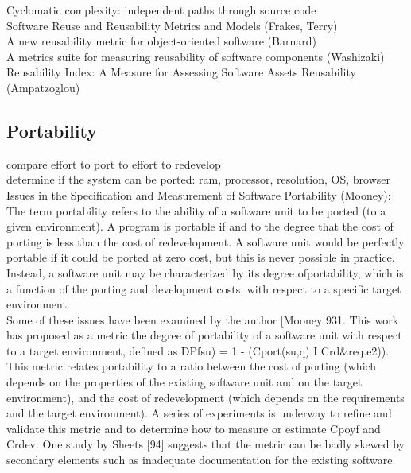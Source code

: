 \documentclass{article}
\begin{document}
Cyclomatic complexity: independent paths through source code\\ 

Software Reuse and Reusability Metrics and Models (Frakes, Terry)\\ 

A new reusability metric for object-oriented software (Barnard)\\ 

A metrics suite for measuring reusability of software components (Washizaki)\\ 

Reusability Index: A Measure for Assessing Software Assets Reusability (Ampatzoglou) 
\subsection{Portability}
compare effort to port to effort to redevelop\\ 

determine if the system can be ported: ram, processor, resolution, OS, browser\\ 

Issues in the Specification and Measurement of Software Portability (Mooney):\\
The term portability
 refers to the ability of a software
 unit to be ported (to a given environment).
 A program is
 portable if and to the degree that the cost of porting is less than
 the cost of redevelopment. A software unit would be perfectly
 portable if it could be ported at zero cost, but this is never
 possible in practice.
 Instead, a software unit may be
 characterized by its degree ofportability,
 which is a function of
 the porting and development costs, with respect to a specific
 target environment.\\   
 
 Some of these issues have been examined by the author
 [Mooney 931. This work has proposed as a metric the degree of
 portability
 of a software unit with respect to a target
 environment, defined as
 DPfsu) = 1 - (Cport(su,q) I Crd$\&$req.e2)).\\
 This metric relates portability to a ratio between the cost
 of porting (which depends on the properties of the existing
 software unit and on the target environment), and the cost of
 redevelopment (which depends on the requirements and the
 target environment). A series of experiments is underway to
 refine and validate this metric and to determine how to measure
 or estimate Cpoyf and Crdev.
 One study by Sheets [94]
 suggests that the metric can be badly skewed by secondary
 elements such as inadequate documentation for the existing
 software.\\
   
\end{document}
